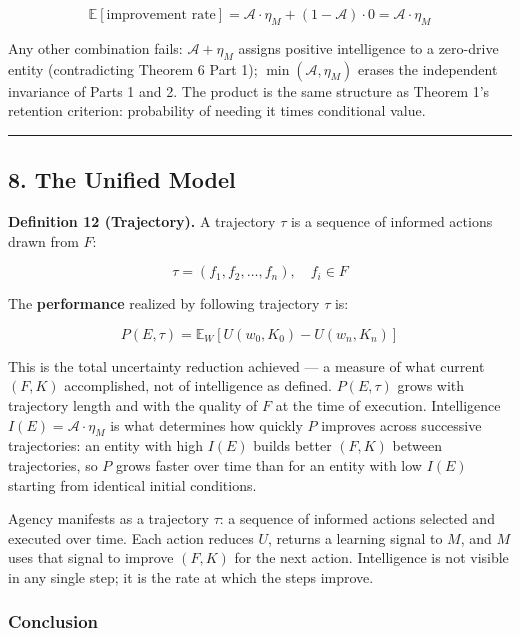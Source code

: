 \documentclass[
]{article}
\begin{document}
\[\mathbb{E}[\text{improvement rate}] = \mathcal{A} \cdot \eta_M + (1 - \mathcal{A}) \cdot 0 = \mathcal{A} \cdot \eta_M\]

Any other combination fails: \(\mathcal{A} + \eta_M\) assigns positive
intelligence to a zero-drive entity (contradicting Theorem 6 Part 1);
\(\min(\mathcal{A}, \eta_M)\) erases the independent invariance of Parts
1 and 2. The product is the same structure as Theorem 1's retention
criterion: probability of needing it times conditional value.

\begin{center}\rule{0.5\linewidth}{0.5pt}\end{center}

\subsection{8. The Unified Model}\label{the-unified-model}

\textbf{Definition 12 (Trajectory).} A trajectory \(\tau\) is a sequence
of informed actions drawn from \(F\):

\[\tau = (f_1, f_2, \ldots, f_n), \quad f_i \in F\]

The \textbf{performance} realized by following trajectory \(\tau\) is:

\[P(E, \tau) = \mathbb{E}_W\left[U(w_0, K_0) - U(w_n, K_n)\right]\]

This is the total uncertainty reduction achieved --- a measure of what
current \((F, K)\) accomplished, not of intelligence as defined.
\(P(E, \tau)\) grows with trajectory length and with the quality of
\(F\) at the time of execution. Intelligence \(I(E) = \mathcal{A}
\cdot \eta_M\) is what determines how quickly \(P\) improves across
successive trajectories: an entity with high \(I(E)\) builds better
\((F, K)\) between trajectories, so \(P\) grows faster over time than
for an entity with low \(I(E)\) starting from identical initial
conditions.

Agency manifests as a trajectory \(\tau\): a sequence of informed
actions selected and executed over time. Each action reduces \(U\),
returns a learning signal to \(M\), and \(M\) uses that signal to
improve \((F, K)\) for the next action. Intelligence is not visible in
any single step; it is the rate at which the steps improve.

\subsubsection{Conclusion}\label{conclusion}
\end{document}

